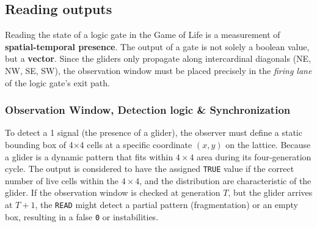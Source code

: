 \subsection{Reading outputs}
Reading the state of a logic gate in the Game of Life is a measurement of \textbf{spatial-temporal presence}. The
output of a gate is not solely a boolean value, but a \textbf{vector}. Since the gliders only propagate along
intercardinal diagonals (NE, NW, SE, SW), the observation window must be placed precisely in the \textit{firing lane} of
the logic gate's exit path.

\subsubsection{Observation Window, Detection logic \& Synchronization}
To detect a 1 signal (the presence of a glider), the observer must
define a static bounding box of 4×4 cells at a specific coordinate $(x,y)$ on the lattice. Because a glider is a
dynamic pattern that fits within $4\times 4$ area during its four-generation cycle. The output is considered to have
the assigned \texttt{TRUE} value if the correct number of  live cells within the $4 \times 4$, and the distribution are characteristic of the glider.
If the observation window is checked at generation $T$, but the glider arrives at $T+1$,
the \texttt{READ} might detect a partial pattern (fragmentation) or an empty box, resulting in a false \texttt{0} or
instabilities.